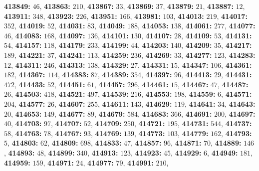 \textsf{\bfseries 413849:} $46$, \textsf{\bfseries 413863:} $210$, \textsf{\bfseries 413867:} $33$, \textsf{\bfseries 413869:} $37$, \textsf{\bfseries 413879:} $21$, \textsf{\bfseries 413887:} $12$, \textsf{\bfseries 413911:} $348$, \textsf{\bfseries 413923:} $226$, \textsf{\bfseries 413951:} $166$, \textsf{\bfseries 413981:} $103$, \textsf{\bfseries 414013:} $219$, \textsf{\bfseries 414017:} $352$, \textsf{\bfseries 414019:} $52$, \textsf{\bfseries 414031:} $83$, \textsf{\bfseries 414049:} $188$, \textsf{\bfseries 414053:} $138$, \textsf{\bfseries 414061:} $277$, \textsf{\bfseries 414077:} $46$, \textsf{\bfseries 414083:} $168$, \textsf{\bfseries 414097:} $136$, \textsf{\bfseries 414101:} $130$, \textsf{\bfseries 414107:} $28$, \textsf{\bfseries 414109:} $53$, \textsf{\bfseries 414131:} $54$, \textsf{\bfseries 414157:} $118$, \textsf{\bfseries 414179:} $233$, \textsf{\bfseries 414199:} $44$, \textsf{\bfseries 414203:} $140$, \textsf{\bfseries 414209:} $35$, \textsf{\bfseries 414217:} $189$, \textsf{\bfseries 414221:} $37$, \textsf{\bfseries 414241:} $113$, \textsf{\bfseries 414259:} $236$, \textsf{\bfseries 414269:} $33$, \textsf{\bfseries 414277:} $123$, \textsf{\bfseries 414283:} $12$, \textsf{\bfseries 414311:} $246$, \textsf{\bfseries 414313:} $138$, \textsf{\bfseries 414329:} $27$, \textsf{\bfseries 414331:} $15$, \textsf{\bfseries 414347:} $106$, \textsf{\bfseries 414361:} $182$, \textsf{\bfseries 414367:} $114$, \textsf{\bfseries 414383:} $87$, \textsf{\bfseries 414389:} $354$, \textsf{\bfseries 414397:} $96$, \textsf{\bfseries 414413:} $29$, \textsf{\bfseries 414431:} $472$, \textsf{\bfseries 414433:} $52$, \textsf{\bfseries 414451:} $61$, \textsf{\bfseries 414457:} $296$, \textsf{\bfseries 414461:} $15$, \textsf{\bfseries 414467:} $47$, \textsf{\bfseries 414487:} $26$, \textsf{\bfseries 414503:} $418$, \textsf{\bfseries 414521:} $497$, \textsf{\bfseries 414539:} $216$, \textsf{\bfseries 414553:} $198$, \textsf{\bfseries 414559:} $6$, \textsf{\bfseries 414571:} $204$, \textsf{\bfseries 414577:} $26$, \textsf{\bfseries 414607:} $255$, \textsf{\bfseries 414611:} $143$, \textsf{\bfseries 414629:} $119$, \textsf{\bfseries 414641:} $34$, \textsf{\bfseries 414643:} $20$, \textsf{\bfseries 414653:} $149$, \textsf{\bfseries 414677:} $89$, \textsf{\bfseries 414679:} $584$, \textsf{\bfseries 414683:} $366$, \textsf{\bfseries 414691:} $200$, \textsf{\bfseries 414697:} $40$, \textsf{\bfseries 414703:} $97$, \textsf{\bfseries 414707:} $52$, \textsf{\bfseries 414709:} $250$, \textsf{\bfseries 414721:} $195$, \textsf{\bfseries 414731:} $544$, \textsf{\bfseries 414737:} $58$, \textsf{\bfseries 414763:} $78$, \textsf{\bfseries 414767:} $93$, \textsf{\bfseries 414769:} $139$, \textsf{\bfseries 414773:} $103$, \textsf{\bfseries 414779:} $162$, \textsf{\bfseries 414793:} $5$, \textsf{\bfseries 414803:} $62$, \textsf{\bfseries 414809:} $698$, \textsf{\bfseries 414833:} $47$, \textsf{\bfseries 414857:} $96$, \textsf{\bfseries 414871:} $70$, \textsf{\bfseries 414889:} $146$, \textsf{\bfseries 414893:} $48$, \textsf{\bfseries 414899:} $340$, \textsf{\bfseries 414913:} $123$, \textsf{\bfseries 414923:} $45$, \textsf{\bfseries 414929:} $6$, \textsf{\bfseries 414949:} $181$, \textsf{\bfseries 414959:} $159$, \textsf{\bfseries 414971:} $24$, \textsf{\bfseries 414977:} $79$, \textsf{\bfseries 414991:} $210$, 
